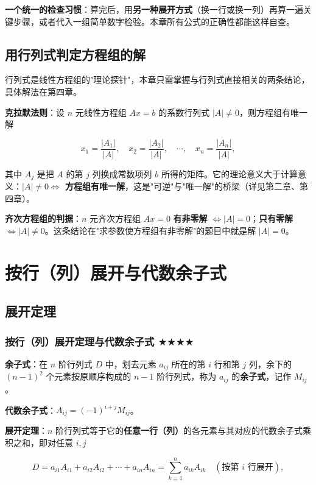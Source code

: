 \documentclass[11pt,openany,UTF8]{ctexbook}
\begin{document}
\textbf{一个统一的检查习惯}：算完后，用\textbf{另一种展开方式}（换一行或换一列）再算一遍关键步骤，或者代入一组简单数字检验。本章所有公式的正确性都能这样自查。

\subsection{用行列式判定方程组的解}

行列式是线性方程组的"理论探针"，本章只需掌握与行列式直接相关的两条结论，具体解法在第四章。

\textbf{克拉默法则}：设 $n$ 元线性方程组 $Ax=b$ 的系数行列式 $\vert A\vert\ne0$，则方程组有唯一解

\[x_1=\frac{\vert A_1\vert}{\vert A\vert},\quad x_2=\frac{\vert A_2\vert}{\vert A\vert},\quad\cdots,\quad x_n=\frac{\vert A_n\vert}{\vert A\vert},\]

其中 $A_j$ 是把 $A$ 的第 $j$ 列换成常数项列 $b$ 所得的矩阵。它的理论意义大于计算意义：\textbf{$\vert A\vert\ne0\iff$ 方程组有唯一解}，这是"可逆"与"唯一解"的桥梁（详见第二章、第四章）。

\textbf{齐次方程组的判据}：$n$ 元齐次方程组 $Ax=0$ \textbf{有非零解} $\iff\vert A\vert=0$；\textbf{只有零解} $\iff\vert A\vert\ne0$。这条结论在"求参数使方程组有非零解"的题目中就是解 $\vert A\vert=0$。

\section{按行（列）展开与代数余子式}

\subsection{展开定理}

\subsubsection{按行（列）展开定理与代数余子式 $\bigstar$$\bigstar$$\bigstar$$\bigstar$}

\textbf{余子式}：在 $n$ 阶行列式 $D$ 中，划去元素 $a_{ij}$ 所在的第 $i$ 行和第 $j$ 列，余下的 $(n-1)^2$ 个元素按原顺序构成的 $n-1$ 阶行列式，称为 $a_{ij}$ 的\textbf{余子式}，记作 $M_{ij}$。

\textbf{代数余子式}：$A_{ij}=(-1)^{i+j}M_{ij}$。

\textbf{展开定理}：$n$ 阶行列式等于它的\textbf{任意一行（列）}的各元素与其对应的代数余子式乘积之和，即对任意 $i,j$

\[D=a_{i1}A_{i1}+a_{i2}A_{i2}+\cdots+a_{in}A_{in}=\sum_{k=1}^{n}a_{ik}A_{ik}\quad(\text{按第 }i\text{ 行展开}),\]
\end{document}
